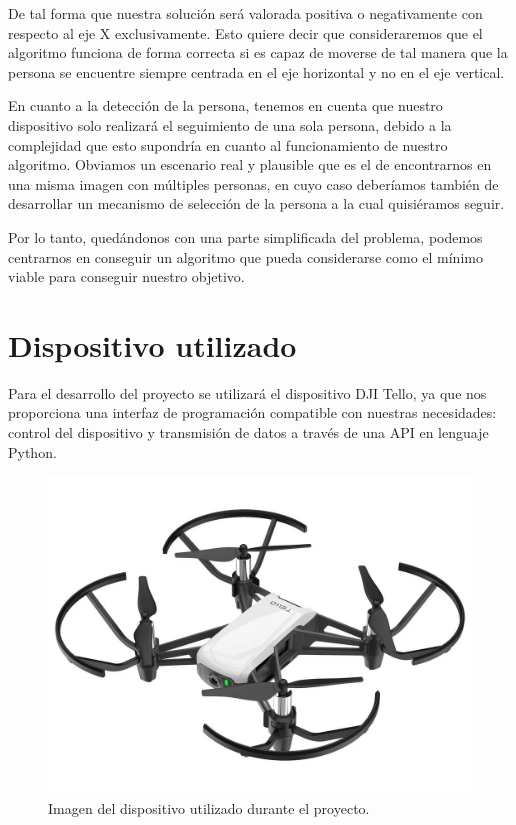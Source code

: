 De tal forma que nuestra solución será valorada positiva o negativamente con respecto al eje X exclusivamente. Esto quiere decir que consideraremos que el algoritmo funciona de forma correcta si es capaz de moverse de tal manera que la persona se encuentre siempre centrada en el eje horizontal y no en el eje vertical.
\medskip

En cuanto a la detección de la persona, tenemos en cuenta que nuestro dispositivo solo realizará el seguimiento de una sola persona, debido a la complejidad que esto supondría en cuanto al funcionamiento de nuestro algoritmo. Obviamos un escenario real y plausible que es el de encontrarnos en una misma imagen con múltiples personas, en cuyo caso deberíamos también de desarrollar un mecanismo de selección de la persona a la cual quisiéramos seguir.
\medskip

Por lo tanto, quedándonos con una parte simplificada del problema, podemos centrarnos en conseguir un algoritmo que pueda considerarse como el mínimo viable para conseguir nuestro objetivo.
\medskip

\section{Dispositivo utilizado}
\label{dispositivo-utilizado}

Para el desarrollo del proyecto se utilizará el dispositivo DJI Tello, ya que nos proporciona una interfaz de programación compatible con nuestras necesidades: control del dispositivo y transmisión de datos a través de una API en lenguaje Python.
\medskip


\begin{figure}[ht!]
  \centering
  \includegraphics[scale=0.2]{figuras/dispositivo_utilizado.png}
  \caption[DJI Tello. Dispositivo utilizado durante el proyecto]{Imagen del dispositivo utilizado durante el proyecto.}
  \label{fig-dron}
\end{figure}


